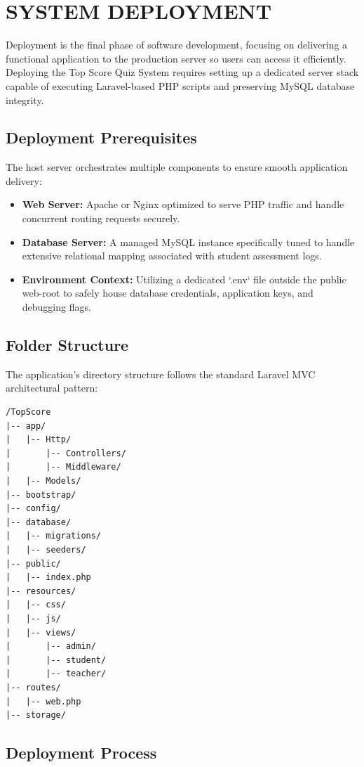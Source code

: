 \chapter{SYSTEM DEPLOYMENT}

Deployment is the final phase of software development, focusing on delivering a functional application to the production server so users can access it efficiently. Deploying the Top Score Quiz System requires setting up a dedicated server stack capable of executing Laravel-based PHP scripts and preserving MySQL database integrity.

\section{Deployment Prerequisites}
The host server orchestrates multiple components to ensure smooth application delivery:
\begin{itemize}
    \item \textbf{Web Server:} Apache or Nginx optimized to serve PHP traffic and handle concurrent routing requests securely.
    \item \textbf{Database Server:} A managed MySQL instance specifically tuned to handle extensive relational mapping associated with student assessment logs.
    \item \textbf{Environment Context:} Utilizing a dedicated `.env` file outside the public web-root to safely house database credentials, application keys, and debugging flags.
\end{itemize}

\section{Folder Structure}

The application's directory structure follows the standard Laravel MVC architectural pattern:
\begin{verbatim}
/TopScore
|-- app/
|   |-- Http/
|       |-- Controllers/
|       |-- Middleware/
|   |-- Models/
|-- bootstrap/
|-- config/
|-- database/
|   |-- migrations/
|   |-- seeders/
|-- public/
|   |-- index.php
|-- resources/
|   |-- css/
|   |-- js/
|   |-- views/
|       |-- admin/
|       |-- student/
|       |-- teacher/
|-- routes/
|   |-- web.php
|-- storage/
\end{verbatim}

\section{Deployment Process}

